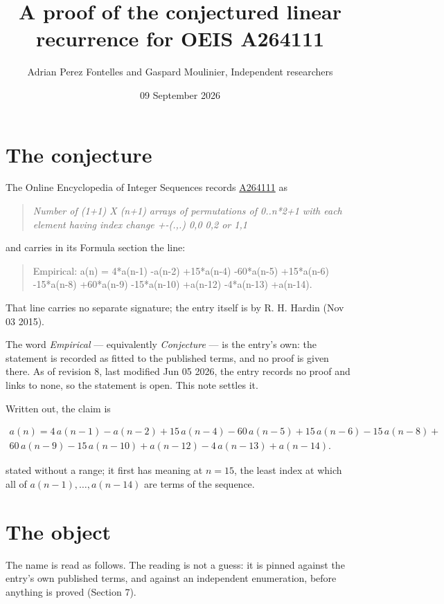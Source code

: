 \documentclass[11pt]{article}
\title{A proof of the conjectured linear recurrence for OEIS A264111}
\author{Adrian Perez Fontelles and Gaspard Moulinier, Independent researchers}
\date{09 September 2026}
\theoremstyle{definition}
\begin{document}
\maketitle
\section{The conjecture}

The Online Encyclopedia of Integer Sequences records \href{https://oeis.org/A264111}{A264111} as

\begin{quote}\itshape Number of (1+1) X (n+1) arrays of permutations of 0..n*2+1 with each element having index change +-(.,.) 0,0 0,2 or 1,1\end{quote}

and carries in its Formula section the line:

\begin{quote}\ttfamily Empirical: a(n) = 4*a(n-1) -a(n-2) +15*a(n-4) -60*a(n-5) +15*a(n-6) -15*a(n-8) +60*a(n-9) -15*a(n-10) +a(n-12) -4*a(n-13) +a(n-14).\end{quote}

That line carries no separate signature; the entry itself is by R. H. Hardin (Nov 03 2015).

The word {\itshape Empirical} --- equivalently {\itshape Conjecture} --- is the entry's own: the statement is recorded as fitted to the published terms, and no proof is given there. As of revision 8, last modified Jun 05 2026, the entry records no proof and links to none, so the statement is open. This note settles it.

Written out, the claim is

\begin{multline*} a(n) = 4\,a(n-1) - a(n-2) + 15\,a(n-4) - 60\,a(n-5) + 15\,a(n-6) - 15\,a(n-8) + \\ 60\,a(n-9) - 15\,a(n-10) + a(n-12) - 4\,a(n-13) + a(n-14). \end{multline*}

stated without a range; it first has meaning at $n = 15$, the least index at which all of $a(n-1),\dots,a(n-14)$ are terms of the sequence.

\section{The object}

The name is read as follows. The reading is not a guess: it is pinned against the entry's own published terms, and against an independent enumeration, before anything is proved (Section 7).
\end{document}
